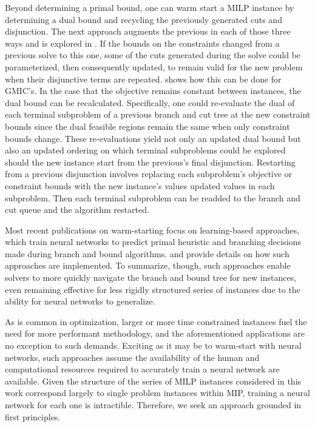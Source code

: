 \documentclass[10pt]{article}
\begin{document}
	Beyond determining a primal bound, one can warm start a MILP instance by determining a dual bound and recycling the previously generated cuts and disjunction. The next approach augments the previous in each of those three ways and is explored in \cite{ws}. If the bounds on the constraints changed from a previous solve to this one, some of the cuts generated during the solve could be parameterized, then consequently updated, to remain valid for the new problem when their disjunctive terms are repeated. \cite{guz} shows how this can be done for GMIC’s. In the case that the objective remains constant between instances, the dual bound can be recalculated. Specifically, one could re-evaluate the dual of each terminal subproblem of a previous branch and cut tree at the new constraint bounds since the dual feasible regions remain the same when only constraint bounds change. These re-evaluations yield not only an updated dual bound but also an updated ordering on which terminal subproblems could be explored should the new instance start from the previous's final disjunction. Restarting from a previous disjunction involves replacing each subproblem's objective or constraint bounds with the new instance's values updated values in each subproblem. Then each terminal subproblem can be readded to the branch and cut queue and the algorithm restarted.
	
	Most recent publications on warm-starting focus on learning-based approaches, which train neural networks to predict primal heuristic and branching decisions made during branch and bound algorithms. \cite{google} and \cite{l2b} provide details on how such approaches are implemented. To summarize, though, such approaches enable solvers to more quickly navigate the branch and bound tree for new instances, even remaining effective for less rigidly structured series of instances due to the ability for neural networks to generalize. 
		
	As is common in optimization, larger or more time constrained instances fuel the need for more performant methodology, and the aforementioned applications are no exception to such demands. Exciting as it may be to warm-start with neural networks, such approaches assume the availability of the human and computational resources required to accurately train a neural network are available. Given the structure of the series of MILP instances considered in this work correspond largely to single problem instances within MIP, training a neural network for each one is intractible. Therefore, we seek an approach grounded in first principles.
	
\end{document}
